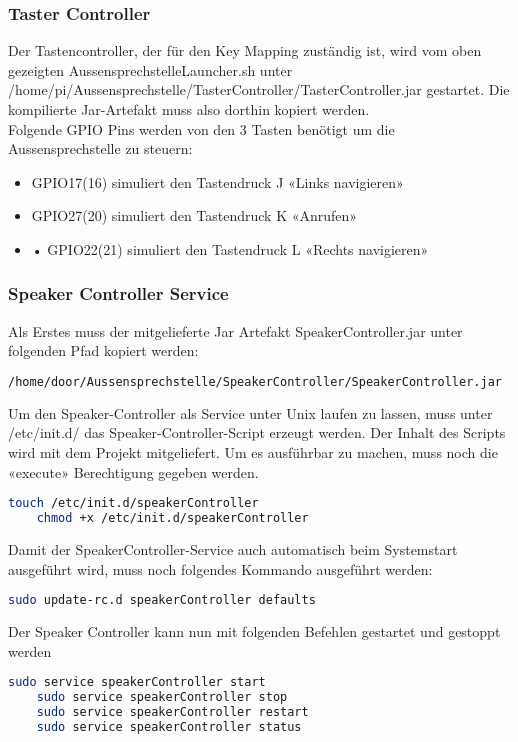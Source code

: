 \subsubsection{Taster Controller}
Der Tastencontroller, der für den Key Mapping zuständig ist, wird vom oben gezeigten AussensprechstelleLauncher.sh unter /home/pi/Aussensprechstelle/TasterController/TasterController.jar gestartet. Die kompilierte Jar-Artefakt  muss also dorthin kopiert werden. 
\\
Folgende GPIO Pins werden von den 3 Tasten benötigt um die Aussensprechstelle zu steuern:
\begin{itemize}
	\item GPIO17(16) simuliert den Tastendruck J «Links navigieren»
	\item GPIO27(20) simuliert den Tastendruck K «Anrufen»
	\item •	GPIO22(21) simuliert den Tastendruck L «Rechts navigieren»
\end{itemize}

\subsubsection{Speaker Controller Service}
Als Erstes muss der mitgelieferte Jar Artefakt SpeakerController.jar unter folgenden Pfad kopiert werden:
\begin{lstlisting}[backgroundcolor = \color{snippetcolor},
language = bash,
xleftmargin = 1cm,
framexleftmargin = 0.1em,
breaklines=true]
	/home/door/Aussensprechstelle/SpeakerController/SpeakerController.jar
\end{lstlisting}
Um den Speaker-Controller als Service unter Unix laufen zu lassen, muss unter /etc/init.d/ das Speaker-Controller-Script erzeugt werden. Der Inhalt des Scripts wird mit dem Projekt mitgeliefert. Um es ausführbar zu machen, muss noch die
«execute» Berechtigung gegeben werden.

\begin{lstlisting}[backgroundcolor = \color{snippetcolor},
language = bash,
xleftmargin = 1cm,
framexleftmargin = 0.1em,
breaklines=true]
	touch /etc/init.d/speakerController
	chmod +x /etc/init.d/speakerController
\end{lstlisting}
Damit der SpeakerController-Service auch automatisch beim Systemstart ausgeführt wird, muss noch folgendes Kommando ausgeführt werden:
\begin{lstlisting}[backgroundcolor = \color{snippetcolor},
language = bash,
xleftmargin = 1cm,
framexleftmargin = 0.1em,
breaklines=true]
	sudo update-rc.d speakerController defaults
\end{lstlisting}
Der Speaker Controller kann nun mit folgenden Befehlen gestartet und gestoppt werden
\begin{lstlisting}[backgroundcolor = \color{snippetcolor},
language = bash,
xleftmargin = 1cm,
framexleftmargin = 0.1em,
breaklines=true]
	sudo service speakerController start
	sudo service speakerController stop
	sudo service speakerController restart
	sudo service speakerController status
\end{lstlisting}

